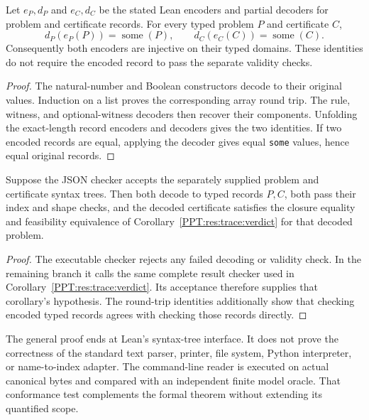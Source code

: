\begin{PPTtheorem}
\label{PPT:res:trace:codec}
Let $e_P,d_P$ and $e_C,d_C$ be the stated Lean encoders and partial decoders for problem and certificate records. For every typed problem $P$ and certificate $C$,
\[
 d_P(e_P(P))=\operatorname{some}(P),\qquad
 d_C(e_C(C))=\operatorname{some}(C).
\]
Consequently both encoders are injective on their typed domains. These identities do not require the encoded record to pass the separate validity checks.
\end{PPTtheorem}
\begin{proof}
The natural-number and Boolean constructors decode to their original values. Induction on a list proves the corresponding array round trip. The rule, witness, and optional-witness decoders then recover their components. Unfolding the exact-length record encoders and decoders gives the two identities. If two encoded records are equal, applying the decoder gives equal \texttt{some} values, hence equal original records.
\end{proof}

\begin{PPTtheorem}
\label{PPT:res:trace:json}
Suppose the JSON checker accepts the separately supplied problem and certificate syntax trees. Then both decode to typed records $P,C$, both pass their index and shape checks, and the decoded certificate satisfies the closure equality and feasibility equivalence of Corollary~\ref{PPT:res:trace:verdict} for that decoded problem.
\end{PPTtheorem}
\begin{proof}
The executable checker rejects any failed decoding or validity check. In the remaining branch it calls the same complete result checker used in Corollary~\ref{PPT:res:trace:verdict}. Its acceptance therefore supplies that corollary's hypothesis. The round-trip identities additionally show that checking encoded typed records agrees with checking those records directly.
\end{proof}

The general proof ends at Lean's  syntax-tree interface. It does not prove the correctness of the standard text parser, printer, file system, Python interpreter, or name-to-index adapter. The command-line reader is executed on actual canonical bytes and compared with an independent finite model oracle. That conformance test complements the formal theorem without extending its quantified scope.

